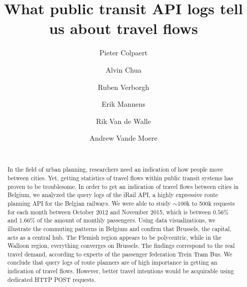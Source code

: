 \documentclass{sig-alternate}
\begin{document}
\title{What public transit API logs tell us about travel flows}
\author{
\alignauthor
Pieter Colpaert\\
\and
\alignauthor
Alvin Chua\\
\and
\alignauthor
Ruben Verborgh\\
\and
\alignauthor
Erik Mannens\\
\and
\alignauthor
Rik Van de Walle\\
\and
\alignauthor
Andrew Vande Moere\\
\\
}

\maketitle
\begin{abstract}

In the field of urban planning, researchers need an indication of how people move between cities. 
Yet, getting statistics of travel flows within public transit systems has proven to be troublesome.
In order to get an indication of travel flows between cities in Belgium,
we analyzed the query logs of the iRail API, a highly expressive route planning API for the Belgian railways.
We were able to study $\sim$100k to 500k requests for each month between October 2012 and November 2015, which is between $0.56\%$ and $1.66\%$ of the amount of monthly passengers.
Using data visualizations, we illustrate the commuting patterns in Belgium and confirm that Brussels, the capital, acts as a central hub. 
The Flemish region appears to be polycentric, while in the Walloon region, everything converges on Brussels.
The findings correspond to the real travel demand, according to experts of the passenger federation Trein Tram Bus.
We conclude that query logs of route planners are of high importance in getting an indication of travel flows.
However, better travel intentions would be acquirable using dedicated HTTP POST requests.

\end{abstract}
\end{document}
